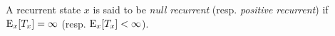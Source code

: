 \begin{definition}
    A recurrent state $x$ is said to be \emph{null recurrent}
    (resp. \emph{positive recurrent}) if $\operatorname{\mathrm{E}}_x[T_x] = \infty$
    (resp. $\operatorname{\mathrm{E}}_x[T_x] < \infty$).
\end{definition}
